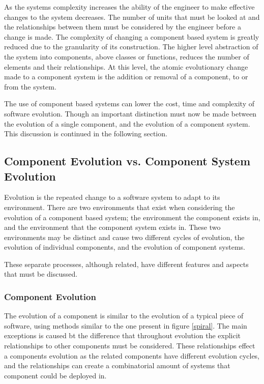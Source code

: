As the systems complexity increases the ability of the engineer to make effective changes to the system decreases.
The number of units that must be looked at and the relationships between them must be considered by the engineer before a change is made.
The complexity of changing a component based system is greatly reduced due to the granularity of its construction.
The higher level abstraction of the system into components, above classes or functions, reduces the number of elements and their relationships.
At this level, the atomic evolutionary change made to a component system is the addition or removal of a component, to or from the system.

The use of component based systems can lower the cost, time and complexity of software evolution.
Though an important distinction must now be made between the evolution of a single component, and the evolution of a component system.
This discussion is continued in the following section.

\subsection{Component Evolution vs. Component System Evolution}
Evolution is the repeated change to a software system to adapt to its environment.
There are two environments that exist when considering the evolution of a component based system; 
the environment the component exists in, and the environment that the component system exists in.
These two environments may be distinct and cause two different cycles of evolution, the evolution of individual components, and the evolution of component systems.

These separate processes, although related, have different features and aspects that must be discussed.

\subsubsection{Component Evolution}
The evolution of a component is similar to the evolution of a typical piece of software, using methods similar to the one present in figure \ref{spiral}.
The main exceptions is caused bt the difference that throughout evolution the explicit relationships to other components must be considered.
These relationships effect a components evolution as the related components have different evolution cycles, 
and the relationships can create a combinatorial amount of systems that component could be deployed in.

